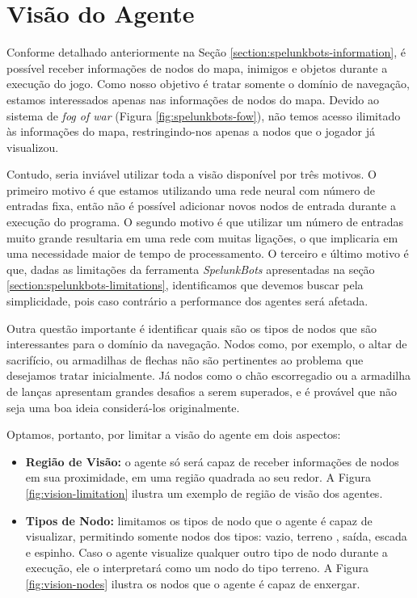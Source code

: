 \section{\label{section:modelling-vision}Visão do Agente}
Conforme detalhado anteriormente na Seção \ref{section:spelunkbots-information},
é possível receber informações de nodos do mapa, inimigos e objetos durante a
execução do jogo. Como nosso objetivo é tratar somente o domínio de navegação,
estamos interessados apenas nas informações de nodos do mapa. Devido ao sistema
de \textit{fog of war} (Figura \ref{fig:spelunkbots-fow}), não temos acesso
ilimitado às informações do mapa, restringindo-nos apenas a nodos que o jogador
já visualizou.

Contudo, seria inviável utilizar toda a visão disponível por três motivos. O
primeiro motivo é que estamos utilizando uma rede neural com número de entradas
fixa, então não é possível adicionar novos nodos de entrada durante a execução
do programa. O segundo motivo é que utilizar um número de entradas muito grande
resultaria em uma rede com muitas ligações, o que implicaria em uma necessidade
maior de tempo de processamento. O terceiro e último motivo é que, dadas as
limitações da ferramenta \textit{SpelunkBots} apresentadas na seção
\ref{section:spelunkbots-limitations}, identificamos que devemos buscar pela
simplicidade, pois caso contrário a performance dos agentes será afetada.

Outra questão importante é identificar quais são os tipos de nodos que são
interessantes para o domínio da navegação. Nodos como, por exemplo, o altar de
sacrifício, ou armadilhas de flechas não são pertinentes ao problema que
desejamos tratar inicialmente. Já nodos como o chão escorregadio ou a armadilha
de lanças apresentam grandes desafios a serem superados, e é provável que não
seja uma boa ideia considerá-los originalmente.

Optamos, portanto, por limitar a visão do agente em dois aspectos:

\begin{itemize}
	\item \textbf{Região de Visão:} o agente só será capaz de receber
		informações de nodos em sua proximidade, em uma região quadrada ao seu
		redor. A Figura \ref{fig:vision-limitation} ilustra um exemplo de região
		de visão dos agentes.

	\item \textbf{Tipos de Nodo:} limitamos os tipos de nodo que o agente é
		capaz de visualizar, permitindo somente nodos dos tipos: vazio, terreno
		, saída, escada e espinho. Caso o agente visualize qualquer outro tipo
		de nodo durante a execução, ele o interpretará como um nodo do tipo
		terreno. A Figura \ref{fig:vision-nodes} ilustra os nodos que o agente é
		capaz de enxergar.
\end{itemize}

